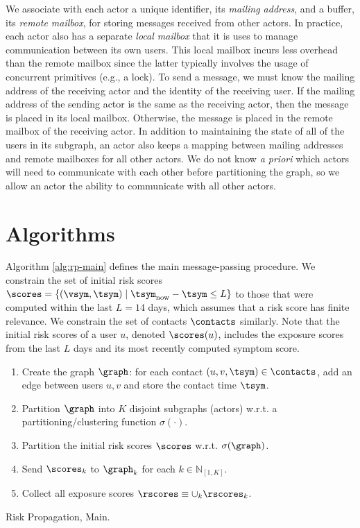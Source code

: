 \par We associate with each actor a unique identifier, its \emph{mailing address}, and a buffer, its \emph{remote mailbox}, for storing messages received from other actors. In practice, each actor also has a separate \emph{local mailbox} that it is uses to manage communication between its own users. This local mailbox incurs less overhead than the remote mailbox since the latter typically involves the usage of concurrent primitives (e.g., a lock). To send a message, we must know the mailing address of the receiving actor and the identity of the receiving user. If the mailing address of the sending actor is the same as the receiving actor, then the message is placed in its local mailbox. Otherwise, the message is placed in the remote mailbox of the receiving actor. In addition to maintaining the state of all of the users in its subgraph, an actor also keeps a mapping between mailing addresses and remote mailboxes for all other actors. We do not know \emph{a priori} which actors will need to communicate with each other before partitioning the graph, so we allow an actor the ability to communicate with all other actors.

\section{Algorithms}\label{sec:algorithms}

\par Algorithm \ref{alg:rp-main} defines the main message-passing procedure. We constrain the set of initial risk scores $\scores = \{(\vsym, \tsym) \mid \tsym_{\text{now}} - \tsym \leq L\}$ to those that were computed within the last $L = 14$ days, which assumes that a risk score has finite relevance. We constrain the set of contacts $\contacts$ similarly. Note that the initial risk scores of a user $u$, denoted $\scores(u)$, includes the exposure scores from the last $L$ days and its most recently computed symptom score.
\begin{algorithm}[tb]
	\begin{enumerate}
		\item Create the graph $\graph$: for each contact $(u, v, \tsym) \in \contacts$, add an edge between users $u, v$ and store the contact time $\tsym$.
		\item Partition $\graph$ into $K$ disjoint subgraphs (actors) w.r.t. a partitioning/clustering function $\sigma(\cdot)$.
		\item Partition the initial risk scores $\scores$ w.r.t. $\sigma(\graph)$.
		\item Send $\scores_k$ to $\graph_k$ for each $k \in \mathbb{N}_{[1, K]}$.
		\item Collect all exposure scores $\rscores \equiv \cup_{k} \rscores_k$.
	\end{enumerate}
	\caption{Risk Propagation, Main.}
	\label{alg:rp-main}
\end{algorithm}

